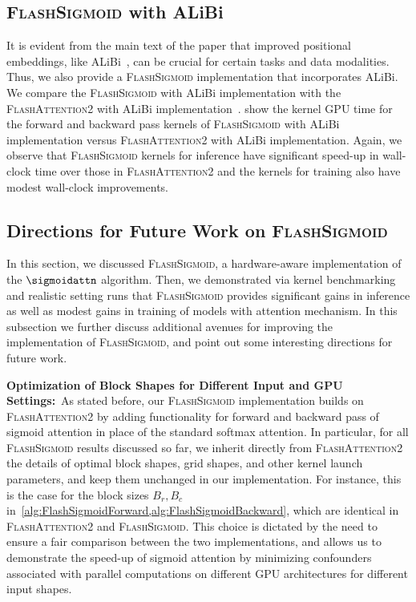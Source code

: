 \vspace{-0.1in}
\subsection{\textsc{FlashSigmoid} with ALiBi}
\label{sec:FlashSigmoidWithALiBi}

\noindent It is evident from the main text of the paper that improved positional embeddings, like ALiBi~\citep{DBLP:conf/iclr/PressSL22}, can be crucial for certain tasks and data modalities. 
Thus, we also provide a \textsc{FlashSigmoid} implementation that incorporates ALiBi.
We compare the \textsc{FlashSigmoid} with ALiBi implementation with the \textsc{FlashAttention2} with ALiBi implementation~\citep{DBLP:journals/corr/abs-2307-08691}.
 show the kernel GPU time for the forward and backward pass kernels of \textsc{FlashSigmoid} with ALiBi implementation versus \textsc{FlashAttention2} with ALiBi implementation.
Again, we observe that \textsc{FlashSigmoid} kernels for inference have significant speed-up in wall-clock time over those in \textsc{FlashAttention2} and the kernels for training also have modest wall-clock improvements. 






\subsection{Directions for Future Work on \textsc{FlashSigmoid}}
\label{sec:DirectionsForFutureWorkOnFlashSigmoid}
\noindent In this section, we discussed \textsc{FlashSigmoid}, a hardware-aware implementation of the $\sigmoidattn$ algorithm. Then, we demonstrated via kernel benchmarking and realistic setting runs that \textsc{FlashSigmoid} provides significant gains in inference as well as modest gains in training of models with attention mechanism. 
In this subsection we further discuss additional avenues for improving the implementation of \textsc{FlashSigmoid}, and point out some interesting directions for future work.


\noindent\textbf{Optimization of Block Shapes for Different Input and GPU Settings:}\ 
As stated before, our \textsc{FlashSigmoid} implementation builds on \textsc{FlashAttention2} by adding functionality for forward and backward pass of sigmoid attention in place of the standard softmax attention.
In particular, for all \textsc{FlashSigmoid} results discussed so far, we inherit directly from \textsc{FlashAttention2} the details of optimal block shapes, grid shapes, and other kernel launch parameters, and keep them unchanged in our implementation.
For instance, this is the case for the block sizes $B _r, B_c$ in~\cref{alg:FlashSigmoidForward,alg:FlashSigmoidBackward}, which are identical in \textsc{FlashAttention2} and \textsc{FlashSigmoid}.
This choice is dictated by the need to ensure a fair comparison between the two implementations, and allows us to demonstrate the speed-up of sigmoid attention by minimizing confounders associated with parallel computations on different GPU architectures for different input shapes. 

